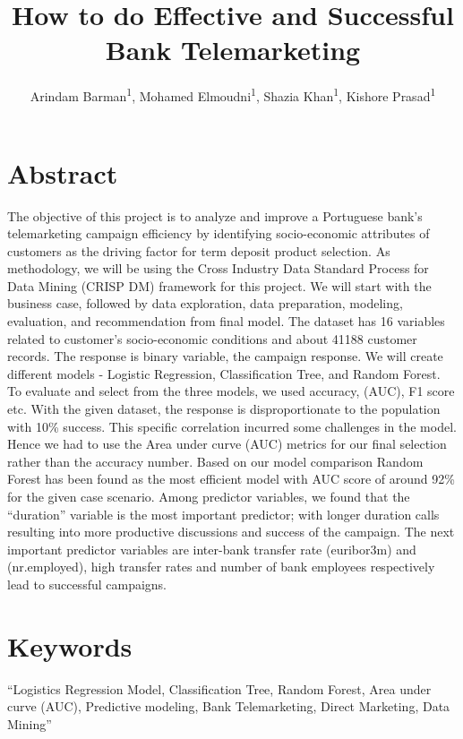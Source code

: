 \documentclass[english,floatsintext,man]{apa6}
\title{How to do Effective and Successful Bank Telemarketing}
\author{
          Arindam Barman\textsuperscript{1},
          Mohamed Elmoudni\textsuperscript{1},
          Shazia Khan\textsuperscript{1},
          Kishore Prasad\textsuperscript{1}  }
\affiliation{
    \vspace{0.5cm}
          \textsuperscript{1} City University of New York (CUNY)  }
\begin{document}
\maketitle



\section{Abstract}\label{abstract}

The objective of this project is to analyze and improve a Portuguese
bank's telemarketing campaign efficiency by identifying socio-economic
attributes of customers as the driving factor for term deposit product
selection. As methodology, we will be using the Cross Industry Data
Standard Process for Data Mining (CRISP DM) framework for this project.
We will start with the business case, followed by data exploration, data
preparation, modeling, evaluation, and recommendation from final model.
The dataset has 16 variables related to customer's socio-economic
conditions and about 41188 customer records. The response is binary
variable, the campaign response. We will create different models -
Logistic Regression, Classification Tree, and Random Forest. To evaluate
and select from the three models, we used accuracy, (AUC), F1 score etc.
With the given dataset, the response is disproportionate to the
population with 10\% success. This specific correlation incurred some
challenges in the model. Hence we had to use the Area under curve (AUC)
metrics for our final selection rather than the accuracy number. Based
on our model comparison Random Forest has been found as the most
efficient model with AUC score of around 92\% for the given case
scenario. Among predictor variables, we found that the
\enquote{duration} variable is the most important predictor; with longer
duration calls resulting into more productive discussions and success of
the campaign. The next important predictor variables are inter-bank
transfer rate (euribor3m) and (nr.employed), high transfer rates and
number of bank employees respectively lead to successful campaigns.

\section{Keywords}\label{keywords}

\enquote{Logistics Regression Model, Classification Tree, Random Forest,
Area under curve (AUC), Predictive modeling, Bank Telemarketing, Direct
Marketing, Data Mining}
\end{document}
